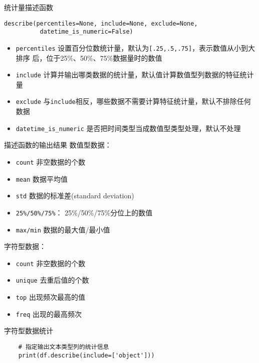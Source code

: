 \documentclass[t]{beamer}
\begin{document}
\begin{frame}[fragile]{统计量描述函数}    
\begin{lstlisting}
describe(percentiles=None, include=None, exclude=None,
          datetime_is_numeric=False)
\end{lstlisting}
    
\begin{itemize}
    \item \verb|percentiles| 设置百分位数统计量，默认为\verb|[.25,.5,.75]|，表示数值从小到大排序
    后，位于25\%、50\%、75\%数据量时的数值
    \item  \verb|include| 计算并输出哪类数据的统计量，默认值计算数值型列数据的特征统计量
    \item  \verb|exclude| 与\verb|include|相反，哪些数据不需要计算特征统计量，默认不排除任何数据
    \item  \verb|datetime_is_numeric| 是否把时间类型当成数值型类型处理，默认不处理
\end{itemize}
\end{frame}


\begin{frame}[fragile]{描述函数的输出结果}
    数值型数据：
\begin{itemize}
    \item \verb|count| 非空数据的个数
    \item \verb|mean| 数据平均值
    \item \verb|std| 数据的标准差({\color{red}st}andard {\color{red}d}eviation)
    \item \verb|25%/50%/75%|： 25\%/50\%/75\%分位上的数值
    \item \verb|max/min| 数据的最大值/最小值
\end{itemize}

字符型数据：
\begin{itemize}
    \item \verb|count| 非空数据的个数
    \item \verb|unique| 去重后值的个数
    \item \verb|top| 出现频次最高的值
    \item \verb|freq| 出现的最高频次
\end{itemize}
\end{frame}

\begin{frame}[fragile]{字符型数据统计}
\begin{lstlisting}
    # 指定输出文本类型列的统计信息
    print(df.describe(include=['object']))
\end{lstlisting}
\end{frame}
\end{document}
